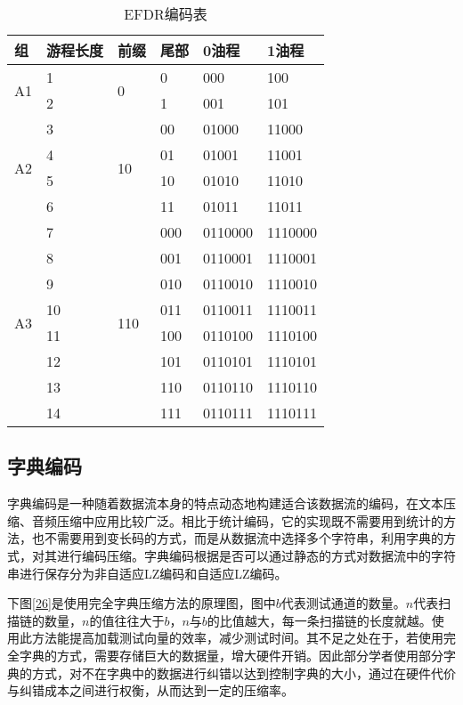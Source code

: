 \begin{table}[H]
\centering
\caption{EFDR编码表}\label{tabl3}
\begin{tabular}{p{1.6cm}p{1.6cm}<{\centering}p{2.2cm}<{\centering}p{2.2cm}<{\centering}p{3cm}<{\centering}p{3cm}<{\centering}}
\toprule
\textbf{组}&	\textbf{游程长度}&     \textbf{前缀}&   \textbf{尾部}&   \textbf{0油程}&   \textbf{1油程}\\
\midrule
\multirow{2}{*}{A1} & 1 & \multirow{2}{*}{0} & 0 & 000& 100 \\
& 2 &  & 1 & 001 & 101 \\
\hline
\multirow{4}{*}{A2} & 3 & \multirow{4}{*}{10} & 00 & 01000& 11000 \\
& 4 &  & 01 & 01001 & 11001\\
& 5 &  & 10 & 01010 & 11010 \\
& 6 &  & 11 & 01011 & 11011 \\
\hline
\multirow{8}{*}{A3} & 7 & \multirow{8}{*}{110} & 000 & 0110000 & 1110000 \\
& 8 &  & 001 & 0110001 & 1110001 \\
& 9 &  & 010 & 0110010 & 1110010 \\
& 10 &  & 011 & 0110011 & 1110011 \\
& 11 &  & 100 & 0110100 & 1110100 \\
& 12 &  & 101 & 0110101 & 1110101 \\
& 13 &  & 110 & 0110110 & 1110110 \\
& 14 &  & 111 & 0110111 & 1110111 \\
\bottomrule
\end{tabular}
\end{table}

\subsection{字典编码}

字典编码是一种随着数据流本身的特点动态地构建适合该数据流的编码，在文本压缩、音频压缩中应用比较广泛。相比于统计编码，它的实现既不需要用到统计的方法，也不需要用到变长码的方式，而是从数据流中选择多个字符串，利用字典的方式，对其进行编码压缩。字典编码根据是否可以通过静态的方式对数据流中的字符串进行保存分为非自适应LZ编码和自适应LZ编码。

下图\ref{26}是使用完全字典压缩方法的原理图，图中$b$代表测试通道的数量。$n$代表扫描链的数量，$n$的值往往大于$b$，$n$与$b$的比值越大，每一条扫描链的长度就越。使用此方法能提高加载测试向量的效率，减少测试时间。其不足之处在于，若使用完全字典的方式，需要存储巨大的数据量，增大硬件开销。因此部分学者使用部分字典的方式，对不在字典中的数据进行纠错以达到控制字典的大小，通过在硬件代价与纠错成本之间进行权衡，从而达到一定的压缩率。

